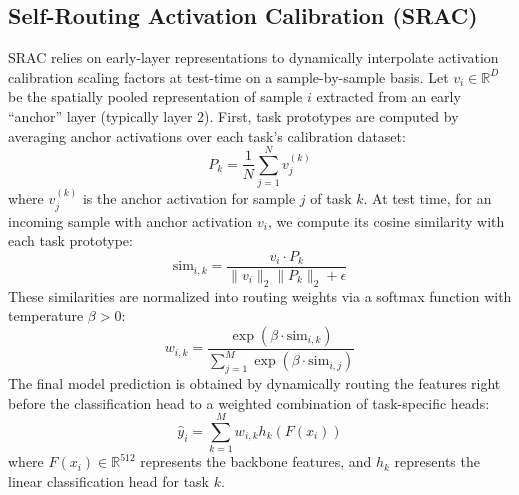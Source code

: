 \documentclass{article}
\theoremstyle{plain}
\theoremstyle{definition}
\theoremstyle{remark}
\begin{document}
\subsection{Self-Routing Activation Calibration (SRAC)}
SRAC relies on early-layer representations to dynamically interpolate activation calibration scaling factors at test-time on a sample-by-sample basis. Let $v_i \in \mathbb{R}^D$ be the spatially pooled representation of sample $i$ extracted from an early ``anchor'' layer (typically layer 2). First, task prototypes are computed by averaging anchor activations over each task's calibration dataset:
\begin{equation}
    P_k = \frac{1}{N} \sum_{j=1}^{N} v_j^{(k)}
\end{equation}
where $v_j^{(k)}$ is the anchor activation for sample $j$ of task $k$. At test time, for an incoming sample with anchor activation $v_i$, we compute its cosine similarity with each task prototype:
\begin{equation}
    \text{sim}_{i, k} = \frac{v_i \cdot P_k}{\|v_i\|_2 \|P_k\|_2 + \epsilon}
\end{equation}
These similarities are normalized into routing weights via a softmax function with temperature $\beta > 0$:
\begin{equation}
    w_{i, k} = \frac{\exp(\beta \cdot \text{sim}_{i, k})}{\sum_{j=1}^{M} \exp(\beta \cdot \text{sim}_{i, j})}
\end{equation}
The final model prediction is obtained by dynamically routing the features right before the classification head to a weighted combination of task-specific heads:
\begin{equation}
    \hat{y}_i = \sum_{k=1}^{M} w_{i, k} h_k(F(x_i))
\end{equation}
where $F(x_i) \in \mathbb{R}^{512}$ represents the backbone features, and $h_k$ represents the linear classification head for task $k$.
\end{document}
